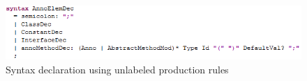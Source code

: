 \documentclass[a4paper]{article}
\begin{document}
\begin{figure}[h]
	\centering
	\includegraphics[width=\textwidth]{images/UnlabeledProduction.png}
	\caption{Syntax declaration using unlabeled production rules}
	\label{fig:UL}
\end{figure}
\end{document}
